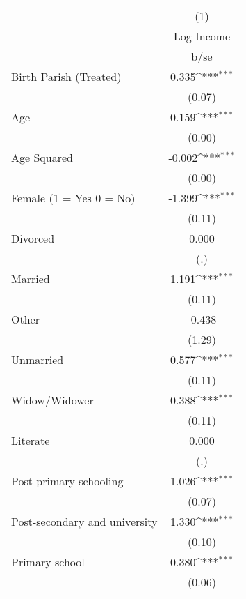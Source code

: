{
\def\sym#1{\ifmmode^{#1}\else\(^{#1}\)\fi}
\begin{tabular}{l*{1}{c}}
\hline\hline
                    &\multicolumn{1}{c}{(1)}\\
                    &\multicolumn{1}{c}{Log Income}\\
                    &        b/se         \\
\hline
Birth Parish (Treated)&       0.335\sym{***}\\
                    &      (0.07)         \\
Age                 &       0.159\sym{***}\\
                    &      (0.00)         \\
Age Squared         &      -0.002\sym{***}\\
                    &      (0.00)         \\
Female (1 = Yes 0 = No)&      -1.399\sym{***}\\
                    &      (0.11)         \\
Divorced            &       0.000         \\
                    &         (.)         \\
Married             &       1.191\sym{***}\\
                    &      (0.11)         \\
Other               &      -0.438         \\
                    &      (1.29)         \\
Unmarried           &       0.577\sym{***}\\
                    &      (0.11)         \\
Widow/Widower       &       0.388\sym{***}\\
                    &      (0.11)         \\
Literate            &       0.000         \\
                    &         (.)         \\
Post primary schooling&       1.026\sym{***}\\
                    &      (0.07)         \\
Post-secondary and university&       1.330\sym{***}\\
                    &      (0.10)         \\
Primary school      &       0.380\sym{***}\\
                    &      (0.06)         \\

\end{tabular}}
